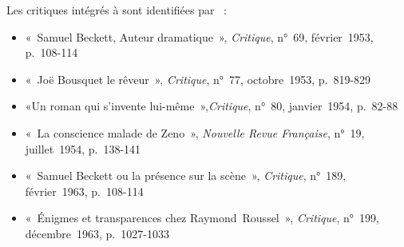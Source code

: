 \documentclass[12pt, a4paper]{article}
\begin{document}
Les critiques intégrés à \punr{} sont identifiées par \galia~:
\begin{itemize}
    \item «~Samuel Beckett, Auteur dramatique~», \textit{Critique}, n°~69, février~1953, p.~108-114
    \item «~Joë Bousquet le rêveur~», \textit{Critique}, n°~77, octobre~1953, p.~819-829
    \item «Un roman qui s'invente lui-même~»,\textit{Critique}, n°~80, janvier~1954, p.~82-88
    \item «~La conscience malade de Zeno~», \textit{Nouvelle Revue Française}, n°~19, juillet~1954, p.~138-141
    \item «~Samuel Beckett ou la présence sur la scène~», \textit{Critique}, n°~189, février~1963, p.~108-114
    \item «~Énigmes et transparences chez Raymond~Roussel~», \textit{Critique}, n°~199, décembre~1963, p.~1027-1033
\end{itemize}
\end{document}

